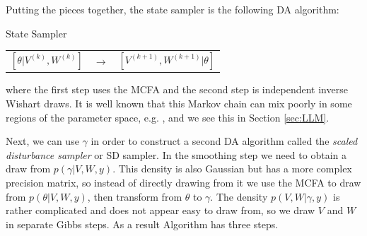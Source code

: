 \documentclass[12pt]{article}
\begin{document}
Putting the pieces together, the state sampler is the following DA algorithm:
\begin{alg*}[State]State Sampler\label{alg:DLMstate}
{\small
\begin{center}
\begin{tabular}{lll}
$[\theta|V^{(k)},W^{(k)}]$ & $\to$ & $[V^{(k+1)},W^{(k+1)}|\theta]$
\end{tabular}
\end{center}
}
\end{alg*}
\noindent where the first step uses the MCFA and the second step is independent inverse Wishart draws. It is well known that this Markov chain can mix poorly in some regions of the parameter space, e.g. \citet{fruhwirth2004efficient}, and we see this in Section \ref{sec:LLM}.

Next, we can use $\gamma$ in order to construct a second DA algorithm called the {\it scaled disturbance sampler} or SD sampler. In the smoothing step we need to obtain a draw from $p(\gamma|V,W,y)$. This density is also Gaussian but has a more complex precision matrix, so instead of directly drawing from it we use the MCFA to draw from $p(\theta|V,W,y)$, then transform from $\theta$ to $\gamma$. The density $p(V,W|\gamma,y)$ is rather complicated and does not appear easy to draw from, so we draw $V$ and $W$ in separate Gibbs steps. As a result Algorithm  has three steps. 
\end{document}
